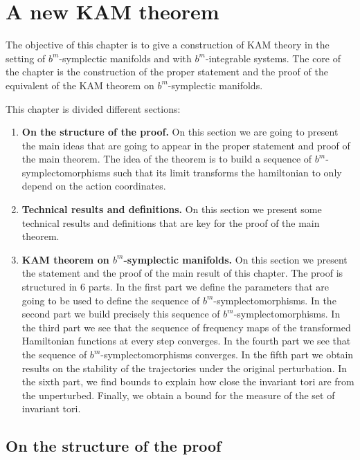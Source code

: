 \chapter{A new KAM theorem}


The objective of this chapter is to give a construction of KAM theory in the setting of $b^m$-symplectic manifolds and with $b^m$-integrable systems. The core of the chapter is the construction of the proper statement and the proof of the equivalent of the KAM theorem on $b^m$-symplectic manifolds.


This chapter is  divided different sections:

\begin{enumerate}
\item \textbf{On the structure of the proof.} On this section we are going to present the main ideas that are going to appear in the proper statement and proof of the main theorem. The idea of the theorem is to build a sequence of $b^m$-symplectomorphisms such that its limit transforms the hamiltonian to only depend on the action coordinates.
\item \textbf{Technical results and definitions.} On this section we present some technical results and definitions that are key for the proof of the main theorem.
\item \textbf{KAM theorem on $b^m$-symplectic manifolds.} On this section we present the statement and the proof of the main result of this chapter. The proof is structured in 6 parts. In the first part we define the parameters that are going to be used to define the sequence of $b^m$-symplectomorphisms. In the second part we build precisely this sequence of $b^m$-symplectomorphisms. In the third part we see that the sequence of frequency maps of the transformed Hamiltonian functions at every step converges. In the fourth part we see that the sequence of $b^m$-symplectomorphisms converges. In the fifth part we obtain results on the stability of the trajectories under the original perturbation. In the sixth part, we find bounds to explain how close the invariant tori are from the unperturbed.
Finally, we obtain a bound for the measure of the set of invariant tori.

\end{enumerate}

\section{On the structure of the proof}

